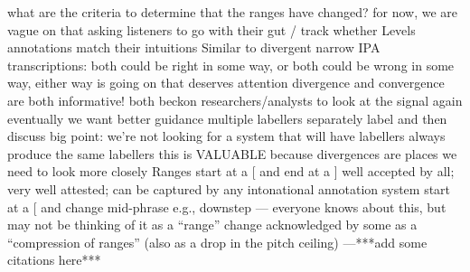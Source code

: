 \markdownRendererUlEndTight \markdownRendererUlItemEnd 
\markdownRendererUlEndTight \markdownRendererUlItemEnd 
\markdownRendererUlItem what are the criteria to determine that the ranges have changed?\markdownRendererInterblockSeparator
{}\markdownRendererUlBeginTight
\markdownRendererUlItem for now, we are vague on that\markdownRendererInterblockSeparator
{}\markdownRendererUlBeginTight
\markdownRendererUlItem asking listeners to go with their gut / track whether Levels annotations match their intuitions\markdownRendererUlItemEnd 
\markdownRendererUlItem Similar to divergent narrow IPA transcriptions: both could be right in some way, or both could be wrong in some way, either way  is going on that deserves attention\markdownRendererUlItemEnd 
\markdownRendererUlItem divergence and convergence are both informative! both beckon researchers/analysts to look at the signal again\markdownRendererUlItemEnd 
\markdownRendererUlEndTight \markdownRendererUlItemEnd 
\markdownRendererUlItem eventually we want better guidance\markdownRendererInterblockSeparator
{}\markdownRendererUlBeginTight
\markdownRendererUlItem multiple labellers separately label and then discuss\markdownRendererUlItemEnd 
\markdownRendererUlEndTight \markdownRendererUlItemEnd 
\markdownRendererUlEndTight \markdownRendererUlItemEnd 
\markdownRendererUlItem big point:\markdownRendererInterblockSeparator
{}\markdownRendererUlBeginTight
\markdownRendererUlItem we're not looking for a system that will have labellers always produce the same labellers\markdownRendererUlItemEnd 
\markdownRendererUlItem this is VALUABLE because divergences are places we need to look more closely\markdownRendererUlItemEnd 
\markdownRendererUlEndTight \markdownRendererUlItemEnd 
\markdownRendererUlItem Ranges\markdownRendererInterblockSeparator
{}\markdownRendererUlBeginTight
\markdownRendererUlItem start at a [ and end at a ]\markdownRendererInterblockSeparator
{}\markdownRendererUlBeginTight
\markdownRendererUlItem well accepted by all; very well attested; can be captured by any intonational annotation system\markdownRendererUlItemEnd 
\markdownRendererUlEndTight \markdownRendererUlItemEnd 
\markdownRendererUlItem start at a [ and change mid-phrase\markdownRendererInterblockSeparator
{}\markdownRendererUlBeginTight
\markdownRendererUlItem e.g., downstep — everyone knows about this, but may not be thinking of it as a “range” change\markdownRendererUlItemEnd 
\markdownRendererUlItem acknowledged by some as a “compression of ranges” (also as a drop in the pitch ceiling) —***\markdownRendererNbsp{}add some citations here***\markdownRendererUlItemEnd 

